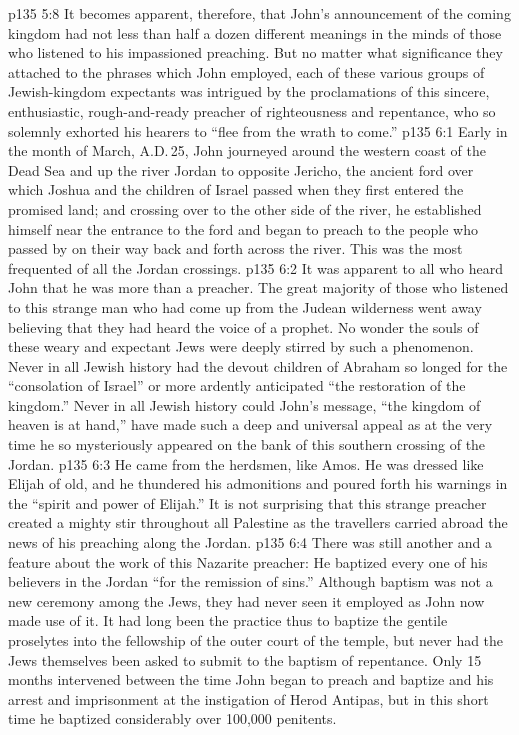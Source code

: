 \vs p135 5:8 It becomes apparent, therefore, that John’s announcement of the coming kingdom had not less than half a dozen different meanings in the minds of those who listened to his impassioned preaching. But no matter what significance they attached to the phrases which John employed, each of these various groups of Jewish\hyp{}kingdom expectants was intrigued by the proclamations of this sincere, enthusiastic, rough\hyp{}and\hyp{}ready preacher of righteousness and repentance, who so solemnly exhorted his hearers to “flee from the wrath to come.”
\vs p135 6:1 Early in the month of March, A.D.\,25, John journeyed around the western coast of the Dead Sea and up the river Jordan to opposite Jericho, the ancient ford over which Joshua and the children of Israel passed when they first entered the promised land; and crossing over to the other side of the river, he established himself near the entrance to the ford and began to preach to the people who passed by on their way back and forth across the river. This was the most frequented of all the Jordan crossings.
\vs p135 6:2 It was apparent to all who heard John that he was more than a preacher. The great majority of those who listened to this strange man who had come up from the Judean wilderness went away believing that they had heard the voice of a prophet. No wonder the souls of these weary and expectant Jews were deeply stirred by such a phenomenon. Never in all Jewish history had the devout children of Abraham so longed for the “consolation of Israel” or more ardently anticipated “the restoration of the kingdom.” Never in all Jewish history could John’s message, “the kingdom of heaven is at hand,” have made such a deep and universal appeal as at the very time he so mysteriously appeared on the bank of this southern crossing of the Jordan.
\vs p135 6:3 He came from the herdsmen, like Amos. He was dressed like Elijah of old, and he thundered his admonitions and poured forth his warnings in the “spirit and power of Elijah.” It is not surprising that this strange preacher created a mighty stir throughout all Palestine as the travellers carried abroad the news of his preaching along the Jordan.
\vs p135 6:4 There was still another and a  feature about the work of this Nazarite preacher: He baptized every one of his believers in the Jordan “for the remission of sins.” Although baptism was not a new ceremony among the Jews, they had never seen it employed as John now made use of it. It had long been the practice thus to baptize the gentile proselytes into the fellowship of the outer court of the temple, but never had the Jews themselves been asked to submit to the baptism of repentance. Only 15 months intervened between the time John began to preach and baptize and his arrest and imprisonment at the instigation of Herod Antipas, but in this short time he baptized considerably over 100,000 penitents.
